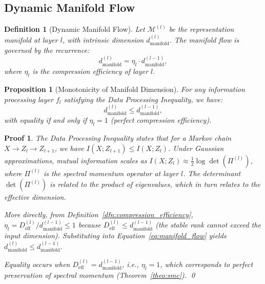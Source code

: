 \documentclass[11pt, a4paper]{article}
\newtheorem{dfn}[theo]{Definition}
\newtheorem{prop}[theo]{Proposition}
\theoremstyle{plain}
\newtheorem*{pf}{Proof}
\def\sM{{\mathcal M}}
\begin{document}
\subsection{Dynamic Manifold Flow}

\begin{dfn}[Dynamic Manifold Flow]\label{dfn:manifold_flow}
Let $\sM^{(l)}$ be the representation manifold at layer $l$, with intrinsic dimension $d_{\text{manifold}}^{(l)}$. The manifold flow is governed by the recurrence:
\begin{equation}
d_{\text{manifold}}^{(l)} = \eta_l \cdot d_{\text{manifold}}^{(l-1)},
\label{eq:manifold_flow}
\end{equation}
where $\eta_l$ is the compression efficiency of layer $l$.
\end{dfn}

\begin{prop}[Monotonicity of Manifold Dimension]\label{prop:monotonicity}
For any information processing layer $f_l$ satisfying the Data Processing Inequality, we have:
\begin{equation}
d_{\text{manifold}}^{(l)} \leq d_{\text{manifold}}^{(l-1)},
\end{equation}
with equality if and only if $\eta_l = 1$ (perfect compression efficiency).
\end{prop}

\begin{pf}
The Data Processing Inequality states that for a Markov chain $X \to Z_l \to Z_{l+1}$, we have $I(X;Z_{l+1}) \leq I(X;Z_l)$. Under Gaussian approximations, mutual information scales as $I(X;Z_l) \approx \frac{1}{2}\log\det(\Pi^{(l)})$, where $\Pi^{(l)}$ is the spectral momentum operator at layer $l$. The determinant $\det(\Pi^{(l)})$ is related to the product of eigenvalues, which in turn relates to the effective dimension.

More directly, from Definition~\ref{dfn:compression_efficiency}, $\eta_l = D_{\text{eff}}^{(l)}/d_{\text{manifold}}^{(l-1)} \leq 1$ because $D_{\text{eff}}^{(l)} \leq d_{\text{manifold}}^{(l-1)}$ (the stable rank cannot exceed the input dimension). Substituting into Equation~\eqref{eq:manifold_flow} yields $d_{\text{manifold}}^{(l)} \leq d_{\text{manifold}}^{(l-1)}$.

Equality occurs when $D_{\text{eff}}^{(l)} = d_{\text{manifold}}^{(l-1)}$, i.e., $\eta_l = 1$, which corresponds to perfect preservation of spectral momentum (Theorem~\ref{theo:smc}).
\qed
\end{pf}
\end{document}
